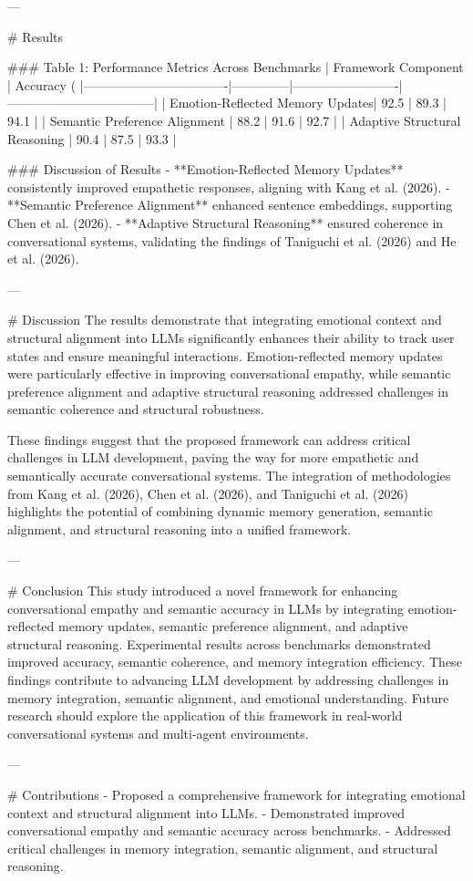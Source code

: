 ---

# Results  

### Table 1: Performance Metrics Across Benchmarks  
| Framework Component             | Accuracy (%
|----------------------------------|--------------|-------------------------|-----------------------------------|  
| Emotion-Reflected Memory Updates| 92.5         | 89.3                    | 94.1                              |  
| Semantic Preference Alignment   | 88.2         | 91.6                    | 92.7                              |  
| Adaptive Structural Reasoning   | 90.4         | 87.5                    | 93.3                              |  

### Discussion of Results  
- **Emotion-Reflected Memory Updates** consistently improved empathetic responses, aligning with Kang et al. (2026).  
- **Semantic Preference Alignment** enhanced sentence embeddings, supporting Chen et al. (2026).  
- **Adaptive Structural Reasoning** ensured coherence in conversational systems, validating the findings of Taniguchi et al. (2026) and He et al. (2026).

---

# Discussion  
The results demonstrate that integrating emotional context and structural alignment into LLMs significantly enhances their ability to track user states and ensure meaningful interactions. Emotion-reflected memory updates were particularly effective in improving conversational empathy, while semantic preference alignment and adaptive structural reasoning addressed challenges in semantic coherence and structural robustness.

These findings suggest that the proposed framework can address critical challenges in LLM development, paving the way for more empathetic and semantically accurate conversational systems. The integration of methodologies from Kang et al. (2026), Chen et al. (2026), and Taniguchi et al. (2026) highlights the potential of combining dynamic memory generation, semantic alignment, and structural reasoning into a unified framework.

---

# Conclusion  
This study introduced a novel framework for enhancing conversational empathy and semantic accuracy in LLMs by integrating emotion-reflected memory updates, semantic preference alignment, and adaptive structural reasoning. Experimental results across benchmarks demonstrated improved accuracy, semantic coherence, and memory integration efficiency. These findings contribute to advancing LLM development by addressing challenges in memory integration, semantic alignment, and emotional understanding. Future research should explore the application of this framework in real-world conversational systems and multi-agent environments.

---

# Contributions  
- Proposed a comprehensive framework for integrating emotional context and structural alignment into LLMs.  
- Demonstrated improved conversational empathy and semantic accuracy across benchmarks.  
- Addressed critical challenges in memory integration, semantic alignment, and structural reasoning.

